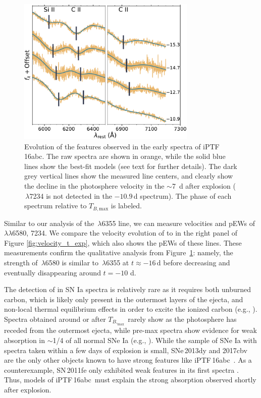 \documentclass[twocolumn]{aastex61}
\newcommand{\abc}{iPTF\,16abc}
\begin{document}
\begin{figure}[]
  \centering
  \includegraphics[width=3.35in]{CarbonFeature.pdf}
  \caption{
  Evolution of the  features observed in the early spectra of \abc.
  The raw spectra are shown in orange, while the solid blue lines show the
  best-fit models (see text for further details). The dark grey vertical lines
  show the measured line centers, and clearly show the decline in the
  photosphere velocity in the $\sim$7~d after explosion (
  \,$\lambda$7234 is not detected in the $-10.9$\,d spectrum). The
  phase of each spectrum relative to $T_{B,\mathrm{max}}$ is labeled.
  }
  \label{fig:carbon}
\end{figure}

Similar to our analysis of the \,$\lambda$6355 line, we can measure
velocities and pEWs of \,$\lambda\lambda$6580, 7234. We compare the
velocity evolution of  to  in the right panel of Figure
\ref{fig:velocity_t_exp}, which also shows the pEWs of these lines. These
measurements confirm the qualitative analysis from Figure~\ref{fig:carbon}:
namely, the strength of \,$\lambda$6580 is similar
to \,$\lambda$6355 at $t \approx -16 \, \mathrm{d}$ before
decreasing and eventually disappearing around $t = -10$ d.

The detection of  in SN Ia spectra is relatively rare as it requires
both unburned carbon, which is likely only present in the outermost layers of
the ejecta, and non-local thermal equilibrium effects in order to excite the
ionized carbon (e.g., \citealt{2007ApJ...654L..53T}). Spectra obtained around
or after $T_{B,_\mathrm{max}}$ rarely show  as the photosphere has
receded from the outermost ejecta, while pre-max spectra show evidence for
weak  absorption in $\sim$1/4 of all normal SNe Ia (e.g.,
\citealt{2011ApJ...732...30P,2011ApJ...743...27T,2012MNRAS.425.1917S}). While
the sample of SNe Ia with spectra taken within a few days of explosion is
small, SNe\,2013dy and 2017cbv are the only other objects known to have strong
 features like \abc\
\citep{2013ApJ...778L..15Z,2017ApJ...845L..11H}. As a counterexample,
SN\,2011fe only exhibited weak  features in its first spectra
\citep{2012ApJ...752L..26P}. Thus, models of \abc\ must explain the strong
\ion{C}{2} absorption observed shortly after explosion.
\end{document}
